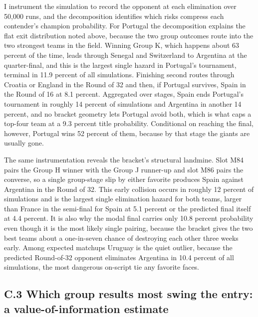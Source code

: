 \documentclass[11pt,letterpaper]{article}
\begin{document}
I instrument the simulation to record the opponent at each elimination over 50{,}000 runs, and the decomposition identifies which risks compress each contender's champion probability. For Portugal the decomposition explains the flat exit distribution noted above, because the two group outcomes route into the two strongest teams in the field. Winning Group K, which happens about 63 percent of the time, leads through Senegal and Switzerland to Argentina at the quarter-final, and this is the largest single hazard in Portugal's tournament, terminal in 11.9 percent of all simulations. Finishing second routes through Croatia or England in the Round of 32 and then, if Portugal survives, Spain in the Round of 16 at 8.1 percent. Aggregated over stages, Spain ends Portugal's tournament in roughly 14 percent of simulations and Argentina in another 14 percent, and no bracket geometry lets Portugal avoid both, which is what caps a top-four team at a 9.3 percent title probability. Conditional on reaching the final, however, Portugal wins 52 percent of them, because by that stage the giants are usually gone.

The same instrumentation reveals the bracket's structural landmine. Slot M84 pairs the Group H winner with the Group J runner-up and slot M86 pairs the converse, so a single group-stage slip by either favorite produces Spain against Argentina in the Round of 32. This early collision occurs in roughly 12 percent of simulations and is the largest single elimination hazard for both teams, larger than France in the semi-final for Spain at 5.1 percent or the predicted final itself at 4.4 percent. It is also why the modal final carries only 10.8 percent probability even though it is the most likely single pairing, because the bracket gives the two best teams about a one-in-seven chance of destroying each other three weeks early. Among expected matchups Uruguay is the quiet outlier, because the predicted Round-of-32 opponent eliminates Argentina in 10.4 percent of all simulations, the most dangerous on-script tie any favorite faces.


\subsection*{C.3 \quad Which group results most swing the entry: a value-of-information estimate}
\end{document}
